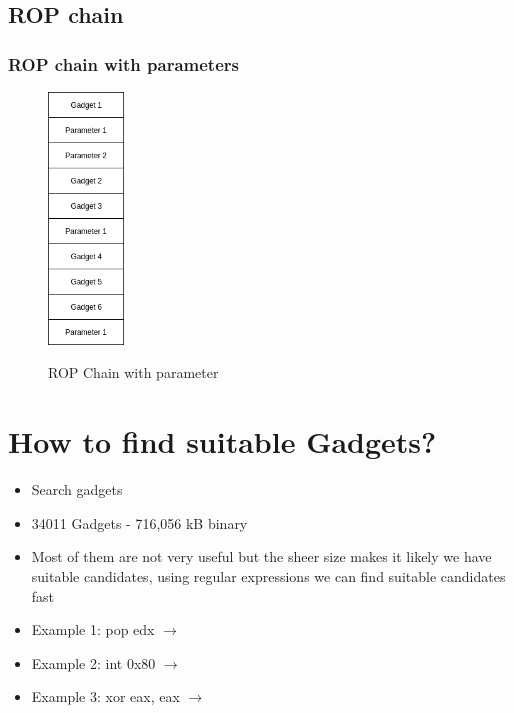 \documentclass[11pt]{beamer}
\begin{document}
\subsection{ROP chain}
\begin{frame}
    \frametitle{ROP chain with parameters}
    \begin{figure}[h]
        \caption{ROP Chain with parameter}
        \centering
        \includegraphics[width=0.18\textwidth]{./img/gadgetstack.png}\label{gadget2}
    \end{figure}
\end{frame}

\section{How to find suitable Gadgets?}
\begin{frame}
    \begin{itemize}
    \item Search gadgets
    \end{itemize}
    \begin{itemize}
        \item 34011 Gadgets - 716,056 kB binary
        \item Most of them are not very useful but the sheer size makes it likely we have suitable candidates, using regular expressions we can find suitable candidates fast
        \item Example 1: pop edx $\rightarrow$ 
        \item Example 2: int 0x80 $\rightarrow$ 
        \item Example 3: xor eax, eax $\rightarrow$ 
    \end{itemize}
\end{frame}
\end{document}
